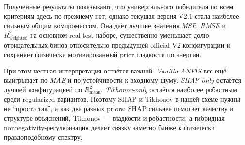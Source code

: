 Полученные результаты показывают, что универсального победителя по всем критериям здесь по-прежнему нет, однако текущая версия V2.1 стала наиболее сильным общим компромиссом. Она даёт лучшие значения \textit{MSE}, \textit{RMSE} и $R^2_{\mathrm{weighted}}$ на основном real-test наборе, существенно уменьшает долю отрицательных бинов относительно предыдущей official V2-конфигурации и сохраняет физически мотивированный prior гладкости по энергии.

При этом честная интерпретация остаётся важной. \textit{Vanilla ANFIS} всё ещё выигрывает по \textit{MAE} и по устойчивости к входному шуму. \textit{SHAP-only} остаётся лучшей конфигурацией по $R^2_{\mathrm{mean}}$. \textit{Tikhonov-only} остаётся наиболее робастным среди regularized-вариантов. Поэтому SHAP и Tikhonov в нашей схеме нужны не ``просто так'', а как два разных priors: SHAP сильнее помогает качеству и структуре объяснений, Tikhonov --- гладкости и робастности, а гибридная nonnegativity-регуляризация делает связку заметно ближе к физически правдоподобному спектру.

